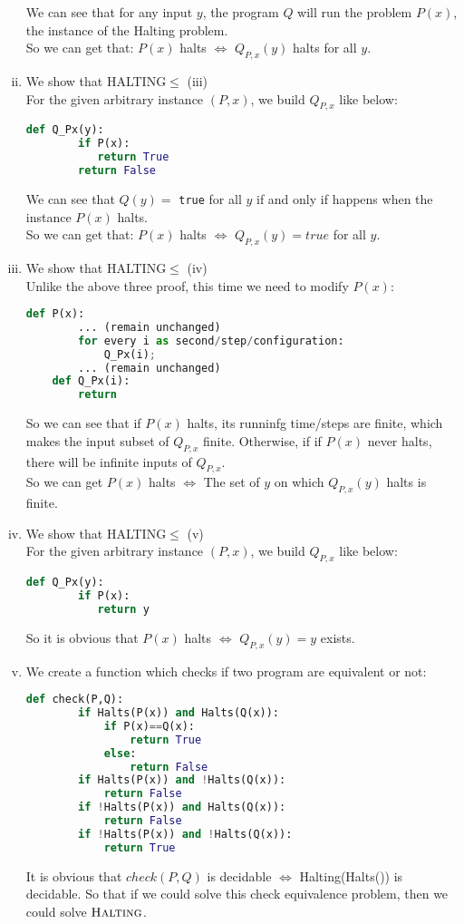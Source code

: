 \begin{enumerate}[(i)]
\begin{lstlisting}[language=python]
    \end{lstlisting}
    We can see that for any input $y$, the program $Q$ will run the problem $P(x)$, the instance of the Halting problem.\\
    So we can get that: $P(x)$ halts $\Leftrightarrow$ $Q_{P,x}(y)$ halts for all $y$.
    \item We show that HALTING$\leq$ (iii)\\
    For the given arbitrary instance $(P, x)$, we build $Q_{P,x}$ like below:
    \begin{lstlisting}[language=python]
    def Q_Px(y):
        if P(x):
           return True
        return False
    \end{lstlisting}
    We can see that $Q(y)=$ {\tt true} for all $y$ if and only if happens when the instance $P(x)$ halts.\\
    So we can get that: $P(x)$ halts $\Leftrightarrow$ $Q_{P,x}(y)=true$ for all $y$.
    \item We show that HALTING$\leq$ (iv)\\
    Unlike the above three proof, this time we need to modify $P(x)$:
    \begin{lstlisting}[language=python]
    def P(x):
        ... (remain unchanged)
        for every i as second/step/configuration:
            Q_Px(i); 
        ... (remain unchanged)
    def Q_Px(i):
        return
    \end{lstlisting}
    So we can see that if $P(x)$ halts, its runninfg time/steps are finite, which makes the input subset of $Q_{P,x}$ finite. Otherwise, if if $P(x)$ never halts, there will be infinite inputs of $Q_{P,x}$.\\
    So we can get $P(x)$ halts $\Leftrightarrow$ The set of $y$ on which $Q_{P,x}(y)$ halts is finite.
    \item We show that HALTING$\leq$ (v)\\
    For the given arbitrary instance $(P, x)$, we build $Q_{P,x}$ like below:
    \begin{lstlisting}[language=python]
    def Q_Px(y):
        if P(x):
           return y
    \end{lstlisting}
    So it is obvious that $P(x)$ halts $\Leftrightarrow$ $Q_{P,x}(y)=y$ exists.
    \item We create a function which checks if two program are equivalent or not:
    \begin{lstlisting}[language=python]
    def check(P,Q):
        if Halts(P(x)) and Halts(Q(x)):
            if P(x)==Q(x):
                return True
            else:
                return False
        if Halts(P(x)) and !Halts(Q(x)):
            return False
        if !Halts(P(x)) and Halts(Q(x)):
            return False
        if !Halts(P(x)) and !Halts(Q(x)):
            return True
    \end{lstlisting}
    It is obvious that $check(P,Q)$ is decidable $\Leftrightarrow$ Halting(Halts()) is decidable. So that if we could solve this check equivalence problem, then we could solve $\textsc{Halting}$.
\end{enumerate}

